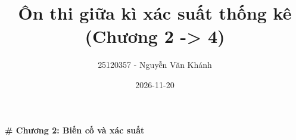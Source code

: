\documentclass[
]{article}
\title{Ôn thi giữa kì xác suất thống kê (Chương 2 -\textgreater{} 4)}
\author{25120357 - Nguyễn Văn Khánh}
\date{2026-11-20}
\begin{document}
\maketitle

\textbf{\# Chương 2: Biến cố và xác suất}
\end{document}

